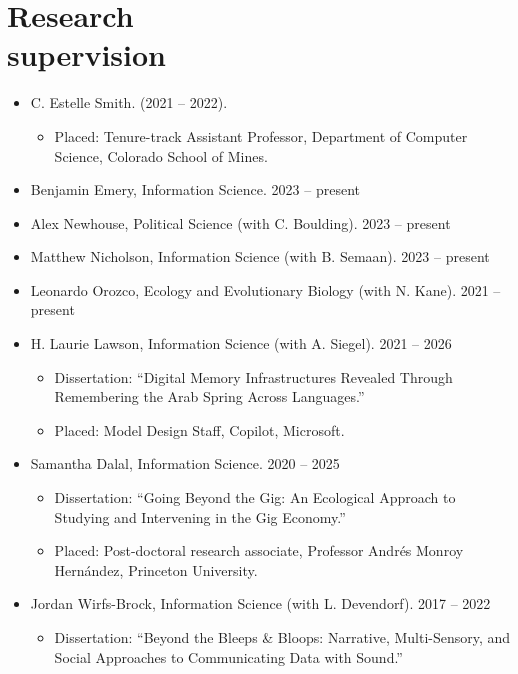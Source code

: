 \documentclass{cv}
\begin{document}
	\section{Research\\supervision}
	\begin{itemize}
		\item C. Estelle Smith. (2021 -- 2022).
		\begin{itemize}
			\item Placed: Tenure-track Assistant Professor, Department of Computer Science, Colorado School of Mines.
		\end{itemize}
	\end{itemize}

	\begin{itemize}
		\item Benjamin Emery, Information Science. \hfill 2023 -- present
		\item Alex Newhouse, Political Science (with C. Boulding). \hfill 2023 -- present
		\item Matthew Nicholson, Information Science (with B. Semaan). \hfill 2023 -- present
		\item Leonardo Orozco, Ecology and Evolutionary Biology (with N. Kane). \hfill 2021 -- present
		\item H. Laurie Lawson, Information Science (with A. Siegel). \hfill 2021 -- 2026
		\begin{itemize}
			\item Dissertation: ``Digital Memory Infrastructures Revealed Through Remembering the Arab Spring Across Languages.''
			\item Placed: Model Design Staff, Copilot, Microsoft.
		\end{itemize}
		\item Samantha Dalal, Information Science. \hfill 2020 -- 2025
		\begin{itemize}
			\item Dissertation: ``Going Beyond the Gig: An Ecological Approach to Studying and Intervening in the Gig Economy.''
			\item Placed: Post-doctoral research associate, Professor Andr\'{e}s Monroy Hern\'{a}ndez, Princeton University.
		\end{itemize}
		\item Jordan Wirfs-Brock, Information Science (with L. Devendorf). \hfill 2017 -- 2022
		\begin{itemize}
			\item Dissertation: ``Beyond the Bleeps \& Bloops: Narrative, Multi-Sensory, and Social Approaches to Communicating Data with Sound.''

\end{itemize}
\end{itemize}
\end{document}
